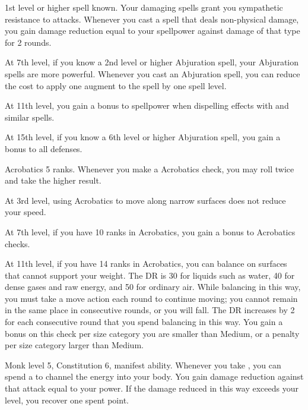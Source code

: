     \featpre 1st level or higher  spell known.
    \featben Your damaging spells grant you sympathetic resistance to attacks.
    Whenever you cast a spell that deals non-physical damage, you gain damage reduction equal to your spellpower against damage of that type for 2 rounds.

    At 7th level, if you know a 2nd level or higher Abjuration spell, your Abjuration spells are more powerful.
    Whenever you cast an Abjuration spell, you can reduce the cost to apply one augment to the spell by one spell level.

    At 11th level, you gain a  bonus to spellpower when dispelling effects with  and similar spells.

    At 15th level, if you know a 6th level or higher Abjuration spell, you gain a  bonus to all defenses.

    \featpre Acrobatics 5 ranks.
    \featben Whenever you make a Acrobatics check, you may roll twice and take the higher result.

    At 3rd level, using Acrobatics to move along narrow surfaces does not reduce your speed.

    At 7th level, if you have 10 ranks in Acrobatics, you gain a  bonus to Acrobatics checks.

    At 11th level, if you have 14 ranks in Acrobatics, you can balance on surfaces that cannot support your weight.
    The DR is 30 for liquids such as water, 40 for dense gases and raw energy, and 50 for ordinary air.
    While balancing in this way, you must take a move action each round to continue moving; you cannot remain in the same place in consecutive rounds, or you will fall.
    The DR increases by 2 for each consecutive round that you spend balancing in this way.
    You gain a  bonus on this check per size category you are smaller than Medium, or a  penalty per size category larger than Medium.

    \featpres Monk level 5, Constitution 6, manifest \ki ability.
    \featben Whenever you take , you can spend a  to channel the energy into your body.
    You gain damage reduction against that attack equal to your \ki power.
    If the damage reduced in this way exceeds your level, you recover one spent \ki point.

